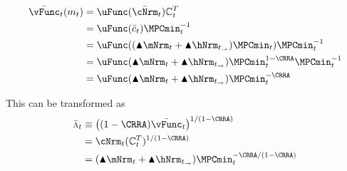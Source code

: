   \begin{equation}\begin{gathered}\begin{aligned}
        \bar{\vFunc}_{\prd}({m}_{\prd})  & = \uFunc(\bar{\cNrm}_{\prd})\PDVCoverc_{\prd}^{T}\label{eq:vFuncPF}
        \\  & = \uFunc(\bar{c}_{\prd}) \MPCmin_{\prd}^{-1} %
        \\  & = \uFunc((\aboveMin \mNrm_{\prd}+\aboveMin \hNrm_{\EndStp})\MPCmin_{\prd}) \MPCmin_{\prd}^{-1} %
        \\  & = \uFunc(\aboveMin \mNrm_{\prd}+\aboveMin \hNrm_{\EndStp})\MPCmin_{\prd}^{1-\CRRA} \MPCmin_{\prd}^{-1} %
        \\  & = \uFunc(\aboveMin \mNrm_{\prd}+\aboveMin \hNrm_{\EndStp})\MPCmin_{\prd}^{-\CRRA}  %
      \end{aligned}\end{gathered}\end{equation}

  This can be transformed as
  \begin{equation*}\begin{gathered}\begin{aligned}
        \bar{\vInv}_{\prd}  & \equiv  \left((1-\CRRA)\bar{\vFunc}_{\prd}\right)^{1/(1-\CRRA)}
        \\  & = \cNrm_{\prd}(\PDVCoverc_{\prd}^{T})^{1/(1-\CRRA)}
        \\  & = (\aboveMin \mNrm_{\prd}+\aboveMin \hNrm_{\EndStp})\MPCmin_{\prd}^{-\CRRA/(1-\CRRA)}   %
      \end{aligned}\end{gathered}\end{equation*}
